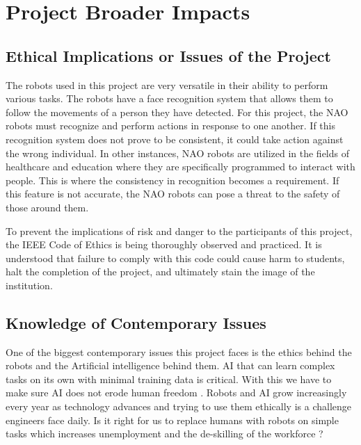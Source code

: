 \chapter{Project Broader Impacts}
\label{ch:projectbroaderimpacts}

\section{Ethical Implications or Issues of the Project}
The robots used in this project are very versatile in their ability to perform various tasks. The robots have a face recognition system that allows them to follow the movements of a person they have detected. For this project, the NAO robots must recognize and perform actions in response to one another. If this recognition system does not prove to be consistent, it could take action against the wrong individual. In other instances, NAO robots are utilized in the fields of healthcare and education where they are specifically programmed to interact with people. This is where the consistency in recognition becomes a requirement. If this feature is not accurate, the NAO robots can pose a threat to the safety of those around them. \par 
To prevent the implications of risk and danger to the participants of this project, the IEEE Code of Ethics is being thoroughly observed and practiced. It is understood that failure to comply with this code could cause harm to students, halt the completion of the project, and ultimately stain the image of the institution. \par 


\section{Knowledge of Contemporary Issues}

One of the biggest contemporary issues this project faces is the ethics behind the robots and the Artificial intelligence behind them. AI that can learn complex tasks on its own with minimal training data is critical. With this we have to make sure AI does not erode human freedom \cite{crowe_2018}. Robots and AI grow increasingly every year as technology advances and trying to use them ethically is a challenge engineers face daily. Is it right for us to replace humans with robots on simple tasks which increases unemployment and the de-skilling of the workforce \cite{crowe_2018}? \par

